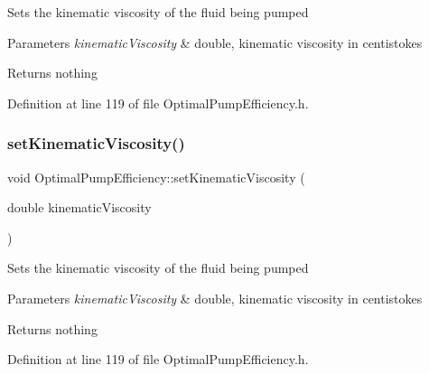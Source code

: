 Sets the kinematic viscosity of the fluid being pumped


\begin{DoxyParams}{Parameters}
{\em kinematic\+Viscosity} & double, kinematic viscosity in centistokes\\
\hline
\end{DoxyParams}
\begin{DoxyReturn}{Returns}
nothing 
\end{DoxyReturn}


Definition at line 119 of file Optimal\+Pump\+Efficiency.\+h.

\mbox{\label{class_optimal_pump_efficiency_a00017e0bd100beb2f4b0bf2db5e3687f}} 
\subsubsection{\texorpdfstring{set\+Kinematic\+Viscosity()}{setKinematicViscosity()}\hspace{0.1cm}{\footnotesize\ttfamily [2/3]}}
{\footnotesize\ttfamily void Optimal\+Pump\+Efficiency\+::set\+Kinematic\+Viscosity (\begin{DoxyParamCaption}\item[{double}]{kinematic\+Viscosity }\end{DoxyParamCaption})\hspace{0.3cm}{\ttfamily [inline]}}

Sets the kinematic viscosity of the fluid being pumped


\begin{DoxyParams}{Parameters}
{\em kinematic\+Viscosity} & double, kinematic viscosity in centistokes\\
\hline
\end{DoxyParams}
\begin{DoxyReturn}{Returns}
nothing 
\end{DoxyReturn}


Definition at line 119 of file Optimal\+Pump\+Efficiency.\+h.

\mbox{\label{class_optimal_pump_efficiency_a00017e0bd100beb2f4b0bf2db5e3687f}} 
